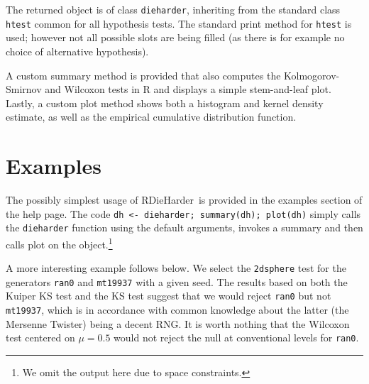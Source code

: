\documentclass[12pt]{article}
\newcommand{\pkg}[1]{{\normalfont\fontseries{b}\selectfont #1}}
\newcommand{\rdieharder}{\pkg{RDieHarder}}
\begin{document}
The returned object is of class \texttt{dieharder}, inheriting from the
standard class \texttt{htest} common for all hypothesis tests.  The standard
print method for \texttt{htest} is used; however not all possible slots are
being filled (as there is for example no choice of alternative hypothesis).

A custom summary method is provided that also computes the Kolmogorov-Smirnov
and Wilcoxon tests in R and displays a simple stem-and-leaf plot.  Lastly, a
custom plot method shows both a histogram and kernel density estimate, as
well as the empirical cumulative distribution function.

\section{Examples}

The possibly simplest usage of \rdieharder\ is provided in the examples section
of the help page. The code \texttt{dh <- dieharder; summary(dh); plot(dh)}
simply calls the \texttt{dieharder} function using the default arguments,
invokes a summary and then calls plot on the object.\footnote{We omit the
  output here due to space constraints.}

A more interesting example follows below. We select the \texttt{2dsphere}
test for the generators \texttt{ran0} and \texttt{mt19937} with a given seed.
The results based on both the Kuiper KS test and the KS test suggest that we
would reject \texttt{ran0} but not \texttt{mt19937}, which is in accordance
with common knowledge about the latter (the Mersenne Twister) being a decent
RNG. It is worth nothing that the Wilcoxon test centered on $\mu=0.5$ would
not reject the null at conventional levels for \texttt{ran0}.

\end{document}
